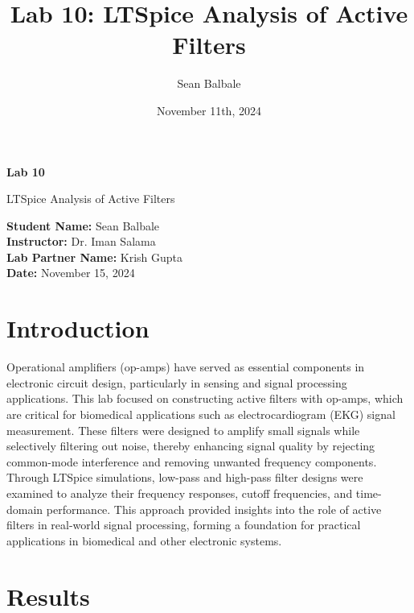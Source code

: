 \documentclass[12pt]{article}
\title{Lab 10: LTSpice Analysis of Active Filters}
\author{Sean Balbale}
\date{November 11th, 2024}
\begin{document}
\begin{titlepage}
  \begin{center}
    \vspace*{1in}

    \Huge
    \textbf{Lab 10}

    \LARGE
    LTSpice Analysis of Active Filters

    \vspace{3 in}

    \textbf{Student Name:} Sean Balbale
    \\ \textbf{Instructor:} Dr. Iman Salama
    \\ \textbf{Lab Partner Name:} Krish Gupta
    \\ \textbf{Date:} November 15, 2024

    \vfill

  \end{center}
\end{titlepage}

\newpage

\section{Introduction}
Operational amplifiers (op-amps) have served as essential components in
electronic circuit design, particularly in sensing and signal processing
applications. This lab focused on constructing active filters with op-amps,
which are critical for biomedical applications such as electrocardiogram (EKG)
signal measurement. These filters were designed to amplify small signals while
selectively filtering out noise, thereby enhancing signal quality by rejecting
common-mode interference and removing unwanted frequency components. Through
LTSpice simulations, low-pass and high-pass filter designs were examined to
analyze their frequency responses, cutoff frequencies, and time-domain
performance. This approach provided insights into the role of active filters in
real-world signal processing, forming a foundation for practical applications in
biomedical and other electronic systems.

\section{Results}
\end{document}

